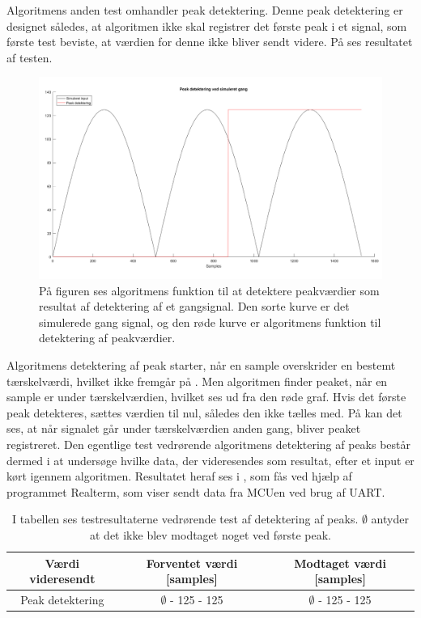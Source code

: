 Algoritmens anden test omhandler peak detektering. Denne peak detektering er designet således, at algoritmen ikke skal registrer det første peak i et signal, som første test beviste, at værdien for denne ikke bliver sendt videre. På  ses resultatet af testen.
\begin{figure}[H]
	\centering
	\includegraphics[scale=0.35]{figures/cDesign/test_peak_gang.png}
	\caption{På figuren ses algoritmens funktion til at detektere peakværdier som resultat af detektering af et gangsignal. Den sorte kurve er det simulerede gang signal, og den røde kurve er algoritmens funktion til detektering af peakværdier.}
	\label{fig:test_peak_gang}
\end{figure}
Algoritmens detektering af peak starter, når en sample overskrider en bestemt tærskelværdi, hvilket ikke fremgår på . Men algoritmen finder peaket, når en sample er under tærskelværdien, hvilket ses ud fra den røde graf. Hvis det første peak detekteres, sættes værdien til nul, således den ikke tælles med. På  kan det ses, at når signalet går under tærskelværdien anden gang, bliver peaket registreret. Den egentlige test vedrørende algoritmens detektering af peaks består dermed i at undersøge hvilke data, der videresendes som resultat, efter et input er kørt igennem algoritmen. Resultatet heraf ses i , som fås ved hjælp af programmet Realterm, som viser sendt data fra MCUen ved brug af UART.
\begin{table}[H]
	\centering
	\begin{tabular}{ccc}
		\hline
		\rowcolor[HTML]{C0C0C0} 
		Værdi videresendt & Forventet værdi [samples] & Modtaget værdi [samples] \\ \hline
		Peak detektering & $\emptyset$ - 125 - 125 & $\emptyset$ - 125 - 125 \\ \hline
	\end{tabular}
	\caption{I tabellen ses testresultaterne vedrørende test af detektering af peaks. $\emptyset$ antyder at det ikke blev modtaget noget ved første peak.}
	\label{tab:test_res_peak}
\end{table}\vspace{-0.5cm}
